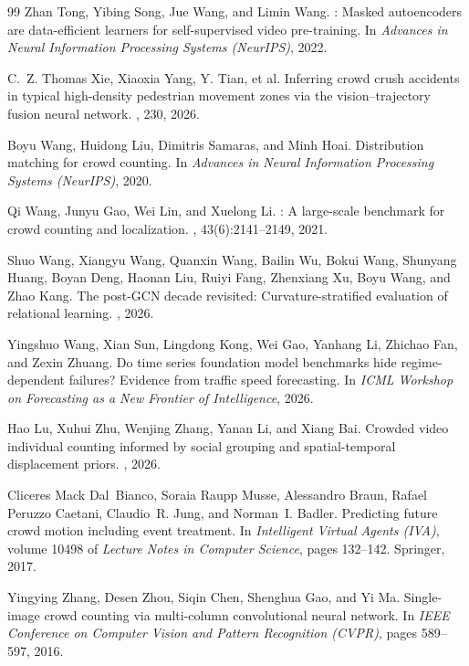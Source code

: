 \documentclass{article}
\begin{document}
{\begin{thebibliography}{99}
Zhan Tong, Yibing Song, Jue Wang, and Limin Wang.
: Masked autoencoders are data-efficient learners for
  self-supervised video pre-training.
\newblock In {\em Advances in Neural Information Processing Systems (NeurIPS)},
  2022.

C.~Z. Thomas Xie, Xiaoxia Yang, Y. Tian, et al.
\newblock Inferring crowd crush accidents in typical high-density pedestrian
  movement zones via the vision--trajectory fusion neural network.
, 230, 2026.

Boyu Wang, Huidong Liu, Dimitris Samaras, and Minh Hoai.
\newblock Distribution matching for crowd counting.
\newblock In {\em Advances in Neural Information Processing Systems (NeurIPS)},
  2020.

Qi Wang, Junyu Gao, Wei Lin, and Xuelong Li.
: A large-scale benchmark for crowd counting and
  localization.
,
  43(6):2141--2149, 2021.

Shuo Wang, Xiangyu Wang, Quanxin Wang, Bailin Wu, Bokui Wang,
  Shunyang Huang, Boyan Deng, Haonan Liu, Ruiyi Fang, Zhenxiang Xu,
  Boyu Wang, and Zhao Kang.
\newblock The post-{GCN} decade revisited: Curvature-stratified evaluation of
  relational learning.
, 2026.

Yingshuo Wang, Xian Sun, Lingdong Kong, Wei Gao, Yanhang Li,
  Zhichao Fan, and Zexin Zhuang.
\newblock Do time series foundation model benchmarks hide regime-dependent
  failures? {E}vidence from traffic speed forecasting.
\newblock In {\em ICML Workshop on Forecasting as a New Frontier of
  Intelligence}, 2026.

Hao Lu, Xuhui Zhu, Wenjing Zhang, Yanan Li, and Xiang Bai.
\newblock Crowded video individual counting informed by social grouping and
  spatial-temporal displacement priors.
, 2026.

Cliceres Mack Dal~Bianco, Soraia Raupp Musse, Alessandro Braun,
  Rafael Peruzzo Caetani, Claudio~R. Jung, and Norman~I. Badler.
\newblock Predicting future crowd motion including event treatment.
\newblock In {\em Intelligent Virtual Agents (IVA)}, volume 10498 of
  {\em Lecture Notes in Computer Science}, pages 132--142. Springer, 2017.

Yingying Zhang, Desen Zhou, Siqin Chen, Shenghua Gao, and Yi Ma.
\newblock Single-image crowd counting via multi-column convolutional neural
  network.
\newblock In {\em IEEE Conference on Computer Vision and Pattern Recognition
  (CVPR)}, pages 589--597, 2016.

\end{thebibliography}
}
\end{document}
